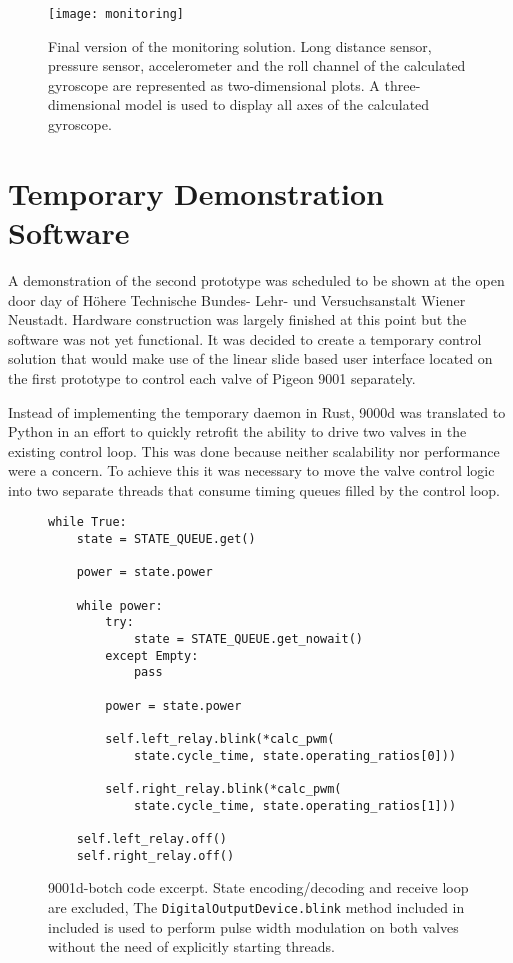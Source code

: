 \begin{figure}[H]
\centering
\texttt{[image: monitoring]}
\caption{Final version of the monitoring solution. Long distance sensor, pressure sensor, accelerometer and the roll channel of the calculated gyroscope are represented as two-dimensional plots. A three-dimensional model is used to display all axes of the calculated gyroscope.}
\end{figure}

\newpage

\section{Temporary Demonstration Software}
\author{Philip Trauner}

A demonstration of the second prototype was scheduled to be shown at the open door day of Höhere Technische Bundes- Lehr- und Versuchsanstalt Wiener Neustadt. Hardware construction was largely finished at this point but the software was not yet functional. It was decided to create a temporary control solution that would make use of the linear slide based user interface located on the first prototype to control each valve of Pigeon 9001 separately. 

Instead of implementing the temporary daemon in Rust, 9000d was translated to Python in an effort to quickly retrofit the ability to drive two valves in the existing control loop. This was done because neither scalability nor performance were a concern. To achieve this it was necessary to move the valve control logic into two separate threads that consume timing queues filled by the control loop. 

\begin{figure}[H]
\begin{verbatim}
while True:
    state = STATE_QUEUE.get()

    power = state.power

    while power:
        try:
            state = STATE_QUEUE.get_nowait()
        except Empty:
            pass

        power = state.power

        self.left_relay.blink(*calc_pwm(
            state.cycle_time, state.operating_ratios[0]))

        self.right_relay.blink(*calc_pwm(
            state.cycle_time, state.operating_ratios[1]))

    self.left_relay.off()
    self.right_relay.off()
\end{verbatim}
\caption{9001d-botch code excerpt. State encoding/decoding and receive loop are excluded, The \texttt{DigitalOutputDevice.blink} method included in included \cite{gpiozero} is used to perform pulse width modulation on both valves without the need of explicitly starting threads.}
\end{figure}

